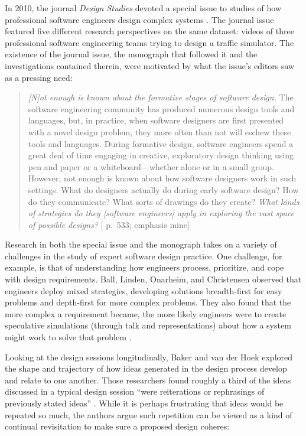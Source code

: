 In 2010, the journal \emph{Design Studies} devoted a special issue to studies of how professional software engineers design complex systems \citep{petre_editorial_2010}. The journal issue featured five different research perspectives on the same dataset: videos of three professional software engineering teams trying to design a traffic simulator. The existence of the journal issue, the monograph that followed it \citep{petre_software_2014} and the investigations contained therein, were motivated by what the issue's editors saw as a pressing need:

\begin{quote}
\emph{{[}N{]}ot enough is known about the formative stages of software design.} The software engineering community has produced numerous design tools and languages, but, in practice, when software designers are first presented with a novel design problem, they more often than not will eschew these tools and languages. During formative design, software engineers spend a great deal of time engaging in creative, exploratory design thinking using pen and paper or a whiteboard---whether alone or in a small group. However, not enough is known about how software designers work in such settings. What do designers actually do during early software design? How do they communicate? What sorts of drawings do they create? \emph{What kinds of strategies do they {[}software engineers{]} apply in exploring the vast space of possible designs?} {[}\citet{petre_editorial_2010} p.~533; emphasis mine{]}
\end{quote}

Research in both the special issue \citep{petre_editorial_2010} and the monograph \citep{petre_software_2014} takes on a variety of challenges in the study of expert software design practice. One challenge, for example, is that of understanding how engineers process, prioritize, and cope with design requirements. Ball, Linden, Onarheim, and Christensen \citeyearpar{ball_design_2010} observed that engineers deploy mixed strategies, developing solutions breadth-first for easy problems and depth-first for more complex problems. They also found that the more complex a requirement became, the more likely engineers were to create speculative simulations (through talk and representations) about how a system might work to solve that problem \citep{ball_design_2010}.

Looking at the design sessions longitudinally, Baker and van der Hoek \citeyearpar{baker_ideas_2010} explored the shape and trajectory of how ideas generated in the design process develop and relate to one another. Those researchers found roughly a third of the ideas discussed in a typical design session ``were reiterations or rephrasings of previously stated ideas'' \citep[ p.~604]{baker_ideas_2010}. While it is perhaps frustrating that ideas would be repeated so much, the authors argue such repetition can be viewed as a kind of continual revisitation to make sure a proposed design coheres:

